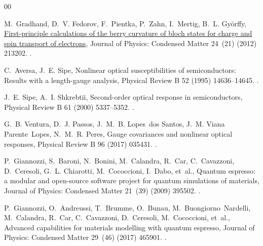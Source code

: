 \documentclass[a4paper,12pt]{report}
\begin{document}

\begin{thebibliography}{00}

M.~Gradhand, D.~V. Fedorov, F.~Pientka, P.~Zahn, I.~Mertig, B.~L. Györffy,
  \href{https://dx.doi.org/10.1088/0953-8984/24/21/213202}{First-principle
  calculations of the berry curvature of bloch states for charge and spin
  transport of electrons}, Journal of Physics: Condensed Matter 24~(21) (2012)
  213202.
\newblock \href {https://doi.org/10.1088/0953-8984/24/21/213202}
  {}.


C.~Aversa, J.~E. Sipe, Nonlinear optical susceptibilities of semiconductors:
  Results with a length-gauge analysis, Physical Review B 52 (1995)
  14636--14645.
\newblock \href {https://doi.org/10.1103/PhysRevB.52.14636}
  {}.

J.~E. Sipe, A.~I. Shkrebtii, Second-order optical response in semiconductors,
  Physical Review B 61 (2000) 5337--5352.
\newblock \href {https://doi.org/10.1103/PhysRevB.61.5337}
  {}.

G.~B. Ventura, D.~J. Passos, J.~M.~B. Lopes~dos Santos, J.~M. Viana
  Parente~Lopes, N.~M.~R. Peres, Gauge covariances and nonlinear optical
  responses, Physical Review B 96 (2017) 035431.
\newblock \href {https://doi.org/10.1103/PhysRevB.96.035431}
  {}.

P.~Giannozzi, S.~Baroni, N.~Bonini, M.~Calandra, R.~Car, C.~Cavazzoni,
  D.~Ceresoli, G.~L. Chiarotti, M.~Cococcioni, I.~Dabo, et~al., Quantum
  espresso: a modular and open-source software project for quantum simulations
  of materials, Journal of Physics: Condensed Matter 21~(39) (2009) 395502.
\newblock \href {https://doi.org/10.1088/0953-8984/21/39/395502}
  {}.

P.~Giannozzi, O.~Andreussi, T.~Brumme, O.~Bunau, M.~Buongiorno~Nardelli,
  M.~Calandra, R.~Car, C.~Cavazzoni, D.~Ceresoli, M.~Cococcioni, et~al.,
  Advanced capabilities for materials modelling with quantum espresso, Journal
  of Physics: Condensed Matter 29~(46) (2017) 465901.
\newblock \href {https://doi.org/10.1088/1361-648X/aa8f79}
  {}.


\end{thebibliography}
\end{document}
